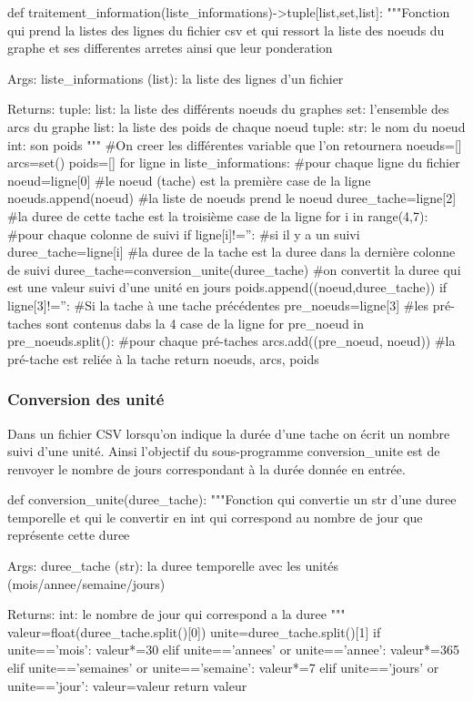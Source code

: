 \documentclass{article}
\begin{document}
\begin{python}
    def traitement_information(liste_informations)->tuple[list,set,list]:
    """Fonction qui prend la listes des lignes du fichier csv et qui ressort la liste des noeuds du graphe et ses differentes arretes ainsi que leur ponderation

    Args:
        liste_informations (list): la liste des lignes d'un fichier

    Returns:
        tuple: 
            list: la liste des différents noeuds du graphes 
            set: l'ensemble des arcs du graphe
            list: la liste des poids de chaque noeud
                tuple: 
                    str: le nom du noeud
                    int: son poids
    """
    #On creer les différentes variable que l'on retournera
    noeuds=[]
    arcs=set()
    poids=[]
    for ligne in liste_informations: #pour chaque ligne du fichier
        noeud=ligne[0] #le noeud (tache) est la première case de la ligne
        noeuds.append(noeud) #la liste de noeuds prend le noeud
        duree_tache=ligne[2] #la duree de cette tache est la troisième case de la ligne
        for i in range(4,7): #pour chaque colonne de suivi
            if ligne[i]!='': #si il y a un suivi
                duree_tache=ligne[i] #la duree de la tache est la duree dans la dernière colonne de suivi
        duree_tache=conversion_unite(duree_tache) #on convertit la duree qui est une valeur suivi d'une unité en jours
        poids.append((noeud,duree_tache)) 
        if ligne[3]!='': #Si la tache à une tache précédentes 
            pre_noeuds=ligne[3] #les pré-taches sont contenus dabs la 4 case de la ligne
            for pre_noeud in pre_noeuds.split(): #pour chaque pré-taches
                arcs.add((pre_noeud, noeud)) #la pré-tache est reliée à la tache
    return noeuds, arcs, poids
\end{python}

\subsubsection{Conversion des unité}
Dans un fichier CSV lorsqu'on indique la durée d'une tache on écrit un nombre suivi d'une unité. Ainsi l'objectif du sous-programme conversion_unite est de renvoyer le nombre de jours correspondant à la durée donnée en entrée.

\begin{python}
    def conversion_unite(duree_tache):
    """Fonction qui convertie un str d'une duree temporelle et qui le convertir en int qui correspond au nombre de jour 
    que représente cette duree

    Args:
        duree_tache (str): la duree temporelle avec les unités (mois/annee/semaine/jours)

    Returns:
        int: le nombre de jour qui correspond a la duree
    """
    valeur=float(duree_tache.split()[0])
    unite=duree_tache.split()[1]
    if unite=='mois':
        valeur*=30
    elif unite=='annees' or unite=='annee':
        valeur*=365
    elif unite=='semaines' or unite=='semaine':
        valeur*=7
    elif unite=='jours' or unite=='jour':
        valeur=valeur
    return valeur
\end{python}
\end{document}
